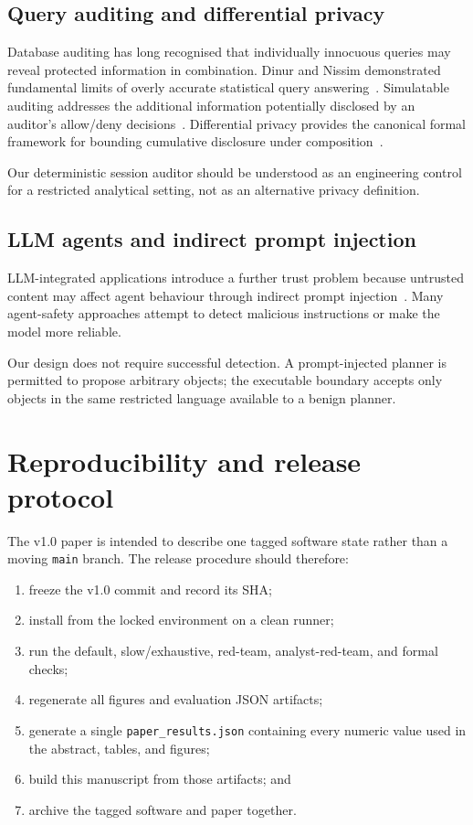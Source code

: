 \documentclass[11pt,a4paper]{article}
\begin{document}
\subsection{Query auditing and differential privacy}

Database auditing has long recognised that individually innocuous queries may
reveal protected information in combination. Dinur and Nissim demonstrated
fundamental limits of overly accurate statistical query answering~\cite{dinur2003}.
Simulatable auditing addresses the additional information potentially disclosed
by an auditor's allow/deny decisions~\cite{kenthapadi2005}. Differential privacy
provides the canonical formal framework for bounding cumulative disclosure under
composition~\cite{dwork2006}.

Our deterministic session auditor should be understood as an engineering
control for a restricted analytical setting, not as an alternative privacy
definition.

\subsection{LLM agents and indirect prompt injection}

LLM-integrated applications introduce a further trust problem because untrusted
content may affect agent behaviour through indirect prompt
injection~\cite{greshake2023}. Many agent-safety approaches attempt to detect
malicious instructions or make the model more reliable.

Our design does not require successful detection. A prompt-injected planner is
permitted to propose arbitrary objects; the executable boundary accepts only
objects in the same restricted language available to a benign planner.

\section{Reproducibility and release protocol}
\label{sec:repro}

The v1.0 paper is intended to describe one tagged software state rather than a
moving \texttt{main} branch. The release procedure should therefore:

\begin{enumerate}[leftmargin=*]
  \item freeze the v1.0 commit and record its SHA;
  \item install from the locked environment on a clean runner;
  \item run the default, slow/exhaustive, red-team, analyst-red-team, and formal
  checks;
  \item regenerate all figures and evaluation JSON artifacts;
  \item generate a single \texttt{paper\_results.json} containing every numeric
  value used in the abstract, tables, and figures;
  \item build this manuscript from those artifacts; and
  \item archive the tagged software and paper together.
\end{enumerate}
\end{document}

